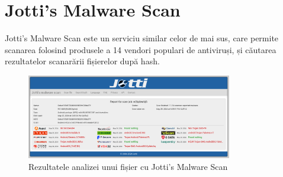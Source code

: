 \documentclass[12pt,a4paper]{report}
\begin{document}
\section{Jotti's Malware Scan}
Jotti's Malware Scan\cite{jotti} este un serviciu similar celor de mai sus,
care permite scanarea folosind produsele a 14 vendori populari de antiviruși, și căutarea rezultatelor scanarării fișierelor după hash.
\begin{figure}[H]
      \centering
      \includegraphics[width=0.8\textwidth]{visuals/jotti.png}
      \caption{Rezultatele analizei unui fișier cu Jotti's Malware Scan}
      \label{fig:jotti_result}
\end{figure}
\end{document}
